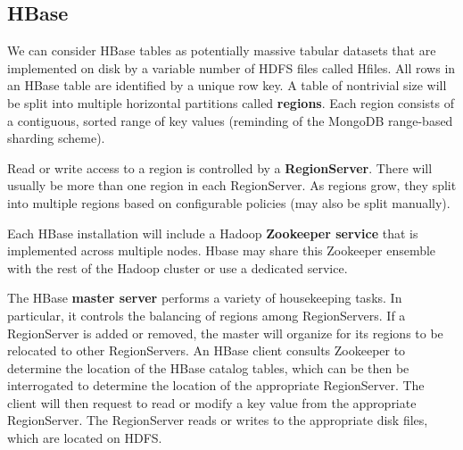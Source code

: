 \documentclass[a4page, 11pt]{article}
\begin{document}
\subsection{HBase}
We can consider HBase tables as potentially massive tabular datasets that are implemented on disk by a variable number of HDFS files called Hfiles.
All rows in an HBase table are identified by a unique row key. A table of nontrivial size will be split into
multiple horizontal partitions called \textbf{regions}. Each region consists of a contiguous, sorted range of key values (reminding of the MongoDB range-based sharding scheme).

Read or write access to a region is controlled by a \textbf{RegionServer}. There will usually be more than one region in each RegionServer. As regions grow, they split into multiple regions based on configurable policies (may also be split manually).

Each HBase installation will include a Hadoop \textbf{Zookeeper service} that is implemented across multiple nodes.
Hbase may share this Zookeeper ensemble with the rest of the Hadoop cluster or use a dedicated service. %

The HBase \textbf{master server} performs a variety of housekeeping tasks. In particular, it controls the balancing of regions among RegionServers. If a RegionServer is added or removed, the master will organize for its regions to be relocated to other RegionServers. An HBase client consults Zookeeper to determine the location of the HBase catalog tables, which can be then be interrogated to determine the location of the appropriate RegionServer. The client will then request to read or modify a key value from the appropriate RegionServer. 
The RegionServer reads or writes to the appropriate disk files, which are located on HDFS. %
\end{document}
